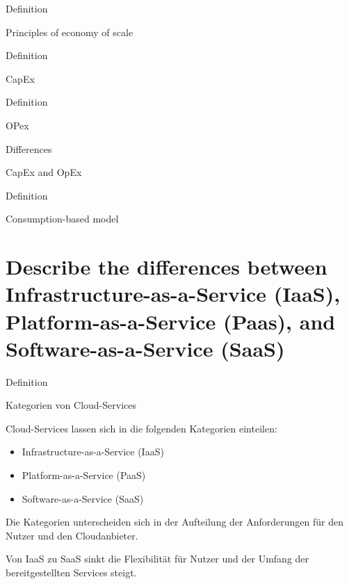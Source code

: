 \documentclass{scrartcl}
\newenvironment{flashcard}[2][]{%
    #1
    \vfill
    \centerline{\Large{#2}}
    \vfill
    \newpage
}
{\newpage}
\newcommand{\sectioncard}[1]{
    \vspace*{\stretch{1}}
    \section{#1}
    \vspace*{\stretch{1}}
    \pagebreak
}
\begin{document}
    \begin{flashcard}[Definition]{Principles of economy of scale}

    \end{flashcard}

    \begin{flashcard}[Definition]{CapEx}

    \end{flashcard}

    \begin{flashcard}[Definition]{OPex}

    \end{flashcard}

    \begin{flashcard}[Differences]{CapEx and OpEx}

    \end{flashcard}


    \begin{flashcard}[Definition]{Consumption-based model}

    \end{flashcard}

    \sectioncard{Describe the differences between Infrastructure-as-a-Service (IaaS), Platform-as-a-Service (Paas), and Software-as-a-Service (SaaS)}

    \begin{flashcard}[Definition]{Kategorien von Cloud-Services}
        Cloud-Services lassen sich in die folgenden Kategorien einteilen:
        \begin{itemize}
            \item Infrastructure-as-a-Service (IaaS)
            \item Platform-as-a-Service (PaaS)
            \item Software-as-a-Service (SaaS)
        \end{itemize}
        Die Kategorien unterscheiden sich in der Aufteilung der Anforderungen für den Nutzer und den Cloudanbieter.

        Von IaaS zu SaaS sinkt die Flexibilität für Nutzer und der Umfang der bereitgestellten Services steigt.

    \end{flashcard}
\end{document}
